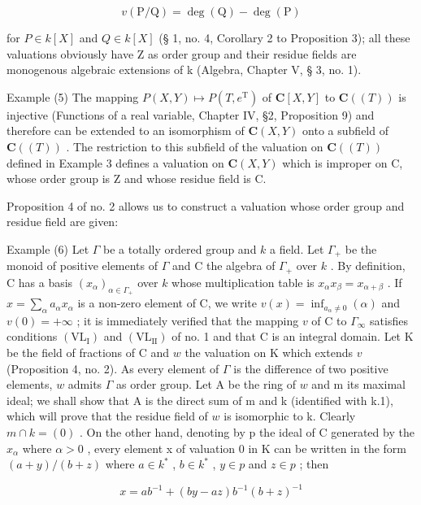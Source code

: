 \[
v (\mathrm{P} / \mathrm{Q}) = \deg (\mathrm{Q}) - \deg (\mathrm{P})
\]

for \(P \in k[X]\) and \(Q \in k[X]\) (§ 1, no. 4, Corollary 2 to Proposition 3); all these valuations obviously have Z as order group and their residue fields are monogenous algebraic extensions of k (Algebra, Chapter V, § 3, no. 1).

Example (5) The mapping \(P(X, Y) \mapsto P(T, e^{\mathrm{T}})\) of \(\mathbf{C}[X, Y]\) to \(\mathbf{C}((T))\) is injective (Functions of a real variable, Chapter IV, §2, Proposition 9) and therefore can be extended to an isomorphism of \(\mathbf{C}(X, Y)\) onto a subfield of \(\mathbf{C}((T))\) . The restriction to this subfield of the valuation on \(\mathbf{C}((T))\) defined in Example 3 defines a valuation on \(\mathbf{C}(X, Y)\) which is improper on C, whose order group is Z and whose residue field is C.

Proposition 4 of no. 2 allows us to construct a valuation whose order group and residue field are given:

Example (6) Let \(\Gamma\) be a totally ordered group and \(k\) a field. Let \(\Gamma_{+}\) be the monoid of positive elements of \(\Gamma\) and C the algebra of \(\Gamma_{+}\) over \(k\) . By definition, C has a basis \((x_{\alpha})_{\alpha \in \Gamma_{+}}\) over \(k\) whose multiplication table is \(x_{\alpha}x_{\beta} = x_{\alpha +\beta}\) . If \(x = \sum_{\alpha}a_{\alpha}x_{\alpha}\) is a non-zero element of C, we write \(v(x) = \inf_{a_{\alpha}\neq 0}(\alpha)\) and \(v(0) = +\infty\) ; it is immediately verified that the mapping \(v\) of C to \(\Gamma_{\infty}\) satisfies conditions \((\mathrm{VL}_{\mathrm{I}})\) and \((\mathrm{VL}_{\mathrm{II}})\) of no. 1 and that C is an integral domain. Let K be the field of fractions of C and \(w\) the valuation on K which extends \(v\) (Proposition 4, no. 2). As every element of \(\Gamma\) is the difference of two positive elements, \(w\) admits \(\Gamma\) as order group. Let A be the ring of \(w\) and m its maximal ideal; we shall show that A is the direct sum of m and k (identified with k.1), which will prove that the residue field of \(w\) is isomorphic to k. Clearly \(m \cap k = (0)\) . On the other hand, denoting by p the ideal of C generated by the \(x_{\alpha}\) where \(\alpha > 0\) , every element x of valuation 0 in K can be written in the form \((a + y)/(b + z)\) where \(a \in k^{*}\) , \(b \in k^{*}\) , \(y \in p\) and \(z \in p\) ; then

\[
x = a b ^ {- 1} + (b y - a z) b ^ {- 1} (b + z) ^ {- 1}
\]

